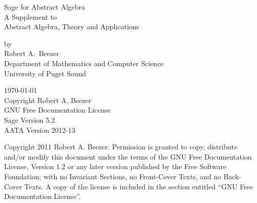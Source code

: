 \documentclass[12pt,oneside]{book}
\begin{document}
\thispagestyle{empty}
\begin{center}
{\fontsize{24}{24}\selectfont%
Sage for Abstract Algebra\\[24pt]
A Supplement to\\[6pt]
Abstract Algebra, Theory and Applications}
\par
{}
%
{\large by\\Robert A.\ Beezer\\Department of Mathematics and Computer Science\\University of Puget Sound}\par
%
%
%
\today\\
Copyright Robert A. Beezer\\
GNU Free Documentation License\\[12pt]
Sage Version 5.2\\
AATA Version 2012-13
%
\end{center}
\newpage
\thispagestyle{empty}
\noindent
Copyright 2011 Robert A. Beezer. Permission is granted to copy, distribute
and/or modify this document under the terms of the GNU Free
Documentation License, Version 1.2 or any later version published by the
Free Software Foundation; with no Invariant Sections, no Front-Cover
Texts, and no Back-Cover Texts. A copy of the license is included in the
section entitled ``GNU Free Documentation License''.
\par
{}
\newpage
\thispagestyle{empty}
\tableofcontents
\newpage
\thispagestyle{empty}
\end{document}
